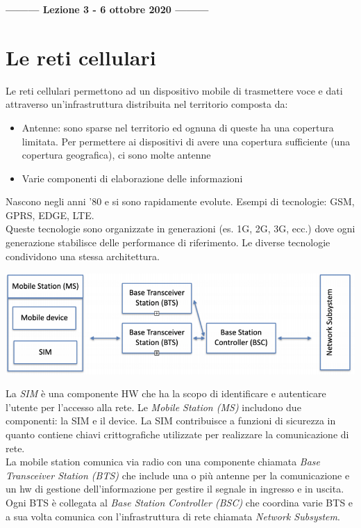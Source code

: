 \begin{center}
    \textbf{--------- Lezione 3 - 6 ottobre 2020 ---------}
\end{center}

\section{Le reti cellulari}
Le reti cellulari permettono ad un dispositivo mobile di trasmettere voce e dati attraverso un'infrastruttura distribuita nel territorio composta da:
\begin{itemize}
    \item Antenne: sono sparse nel territorio ed ognuna di queste ha una copertura limitata. Per permettere ai dispositivi di avere una copertura sufficiente (una copertura geografica), ci sono molte antenne
    \item Varie componenti di elaborazione delle informazioni 
\end{itemize}

Nascono negli anni ’80 e si sono rapidamente evolute. Esempi di tecnologie: GSM, GPRS, EDGE, LTE.
\\ Queste tecnologie sono organizzate in generazioni (es. 1G, 2G, 3G, ecc.) dove ogni generazione stabilisce delle performance di riferimento. 
Le diverse tecnologie condividono una stessa architettura.

\includegraphics[width=\textwidth]{images/Mobile computing/3. Reti e architetture/architettura.PNG}

La \textit{SIM} è una componente HW che ha la scopo di identificare e autenticare l'utente per l'accesso alla rete. 
Le \textit{Mobile Station (MS)} includono due componenti: la SIM e il device.
La SIM contribuisce a funzioni di sicurezza in quanto contiene chiavi crittografiche utilizzate per realizzare la comunicazione di rete. 
\\ La mobile station comunica via radio con una componente chiamata \textit{Base Transceiver Station (BTS)} che include una o più antenne per la comunicazione e un hw di gestione dell'informazione per gestire il segnale in ingresso e in uscita. Ogni BTS è collegata al \textit{Base Station Controller (BSC)} che coordina varie BTS e a sua volta comunica con l'infrastruttura di rete chiamata \textit{Network Subsystem}. 

